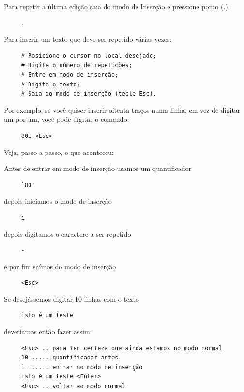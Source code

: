 \documentclass[10pt,a4paper,openany]{book}
\begin{document}
Para repetir a última edição saia do modo de Inserção e pressione ponto (.):

\begin{verbatim}
     .
\end{verbatim}

Para inserir um texto que deve ser repetido várias vezes:

\begin{verbatim}
     # Posicione o cursor no local desejado;
     # Digite o número de repetições;
     # Entre em modo de inserção;
     # Digite o texto;
     # Saia do modo de inserção (tecle Esc).
\end{verbatim}

Por exemplo, se você quiser inserir oitenta traços numa linha, em vez
de digitar um por um, você pode digitar o comando:

\begin{verbatim}
     80i-<Esc>
\end{verbatim}

Veja, passo a passo, o que aconteceu:

 Antes de entrar em modo de inserção usamos um quantificador

\begin{verbatim}
     `80'
\end{verbatim}

 depois iniciamos o modo de inserção

\begin{verbatim}
     i
\end{verbatim}

depois digitamos o caractere a ser repetido

\begin{verbatim}
     -
\end{verbatim}

e por fim saímos do modo de inserção

\begin{verbatim}
     <Esc>
\end{verbatim}

Se desejássemos digitar 10 linhas com o texto

\begin{verbatim}
     isto é um teste
\end{verbatim}

deveríamos então fazer assim:
   
\begin{verbatim}
     <Esc> .. para ter certeza que ainda estamos no modo normal
     10 ..... quantificador antes
     i ...... entrar no modo de inserção
     isto é um teste <Enter>
     <Esc> .. voltar ao modo normal
\end{verbatim}
\end{document}
